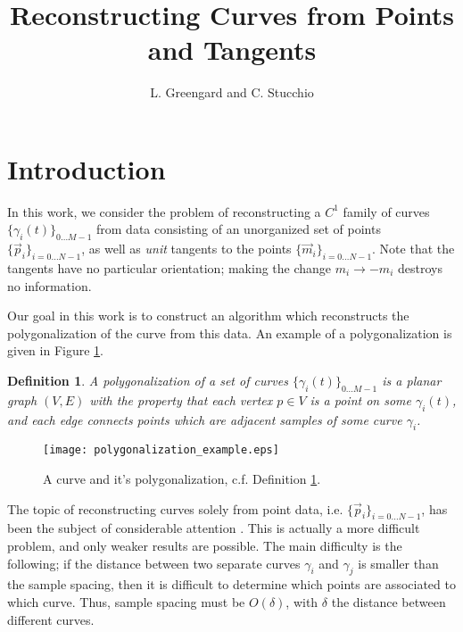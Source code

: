 \documentclass{article}
\newtheorem{definition}[cntr]{Definition}
\numberwithin{cntr}{section}
\numberwithin{equation}{section}
\newcommand{\vp}[0]{{\vec{p}}}
\newcommand{\vm}[0]{{\vec{m}}}
\newcommand{\Oto}[1]{{0 \ldots #1-1}}
\newcommand{\OtoN}{{0 \ldots N-1}}
\newcommand{\pointData}{{ \{ \vp_{i} \}_{i=\OtoN} }}
\newcommand{\tanData}{{ \{ \vm_{i} \}_{i=\OtoN} }}
\newcommand{\curveSet}{{ \{ \gamma_i(t) \}_{\Oto{M}}}}
\newcommand{\curvesep}{{\delta}}
\begin{document}
\title{Reconstructing Curves from Points and Tangents}

\author{L. Greengard and C. Stucchio}

\maketitle

\section{Introduction}

In this work, we consider the problem of reconstructing a $C^{1}$ family of curves $\curveSet$ from data consisting of an unorganized set of points $\pointData$, as well as \emph{unit} tangents to the points $\tanData$. Note that the tangents have no particular orientation; making the change $m_{i} \rightarrow -m_{i}$ destroys no information.

Our goal in this work is to construct an algorithm which reconstructs the polygonalization of the curve from this data. An example of a polygonalization is given in Figure \ref{fig:polygonalization}.

\begin{definition}
  \label{def:polygonalization}
  A polygonalization of a set of curves $\curveSet$ is a planar graph $(V,E)$ with the property that each vertex $p \in V$ is a point on some $\gamma_{i}(t)$, and each edge connects points which are adjacent samples of some curve $\gamma_{i}$.
\end{definition}

\begin{figure}
\setlength{\unitlength}{0.240900pt}
\ifx\plotpoint\undefined\newsavebox{\plotpoint}\fi
\sbox{\plotpoint}{\rule[-0.200pt]{0.400pt}{0.400pt}}%
\texttt{[image: polygonalization\_example.eps]}

\caption{A curve and it's polygonalization, c.f. Definition \ref{def:polygonalization}. }
\label{fig:polygonalization}
\end{figure}

The topic of reconstructing curves solely from point data, i.e. $\pointData$, has been the subject of considerable attention \cite{amenta98crust,amenta98new,dey99curve,hoppe92surface,amenta02simple, dey01reconstructing}. This is actually a more difficult problem, and only weaker results are possible. The main difficulty is the following; if the distance between two separate curves $\gamma_{i}$ and $\gamma_{j}$ is smaller than the sample spacing, then it is difficult to determine which points are associated to which curve. Thus, sample spacing must be $O(\curvesep)$, with $\curvesep$ the distance between different curves.
\end{document}
